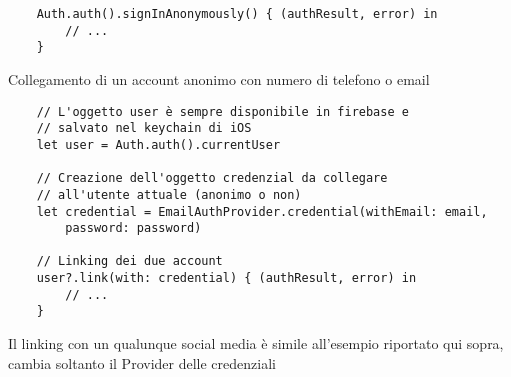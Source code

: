 \begin{verbatim}
    Auth.auth().signInAnonymously() { (authResult, error) in
        // ...
    }
\end{verbatim}

Collegamento di un account anonimo con numero di telefono o email

\begin{verbatim}
    // L'oggetto user è sempre disponibile in firebase e
    // salvato nel keychain di iOS
    let user = Auth.auth().currentUser

    // Creazione dell'oggetto credenzial da collegare
    // all'utente attuale (anonimo o non)
    let credential = EmailAuthProvider.credential(withEmail: email,
        password: password)

    // Linking dei due account
    user?.link(with: credential) { (authResult, error) in
        // ...
    }
\end{verbatim}

Il linking con un qualunque social media è simile all'esempio riportato
qui sopra, cambia soltanto il Provider delle credenziali
